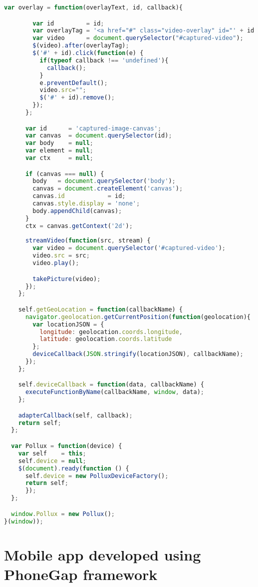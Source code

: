 \begin{appendices}
\begin{lstlisting}[language=JavaScript]
      var overlay = function(overlayText, id, callback){

        var id         = id;
        var overlayTag = '<a href="#" class="video-overlay" id="' + id + '">' + overlayText + '</a>';
        var video      = document.querySelector("#captured-video");
        $(video).after(overlayTag);
        $('#' + id).click(function(e) {
          if(typeof callback !== 'undefined'){
            callback();
          }
          e.preventDefault();
          video.src="";
          $('#' + id).remove();
        });
      };

      var id      = 'captured-image-canvas';
      var canvas  = document.querySelector(id);
      var body    = null;
      var element = null;
      var ctx     = null;

      if (canvas === null) {
        body   = document.querySelector('body');
        canvas = document.createElement('canvas');
        canvas.id            = id;
        canvas.style.display = 'none';
        body.appendChild(canvas);
      }
      ctx = canvas.getContext('2d');
      
      streamVideo(function(src, stream) {
        var video = document.querySelector('#captured-video');
        video.src = src;
        video.play();

        takePicture(video);
      });
    };

    self.getGeoLocation = function(callbackName) {
      navigator.geolocation.getCurrentPosition(function(geolocation){
        var locationJSON = {
          longitude: geolocation.coords.longitude,
          latitude: geolocation.coords.latitude
        };
        deviceCallback(JSON.stringify(locationJSON), callbackName);
      });
    };

    self.deviceCallback = function(data, callbackName) {
      executeFunctionByName(callbackName, window, data);
    };

    adapterCallback(self, callback);
    return self;
  };

  var Pollux = function(device) {
    var self    = this;
    self.device = null;
    $(document).ready(function () {  
      self.device = new PolluxDeviceFactory();
      return self;
      });
  };

  window.Pollux = new Pollux();
}(window));
\end{lstlisting}

\chapter{Mobile app developed using PhoneGap framework}

\end{appendices}
